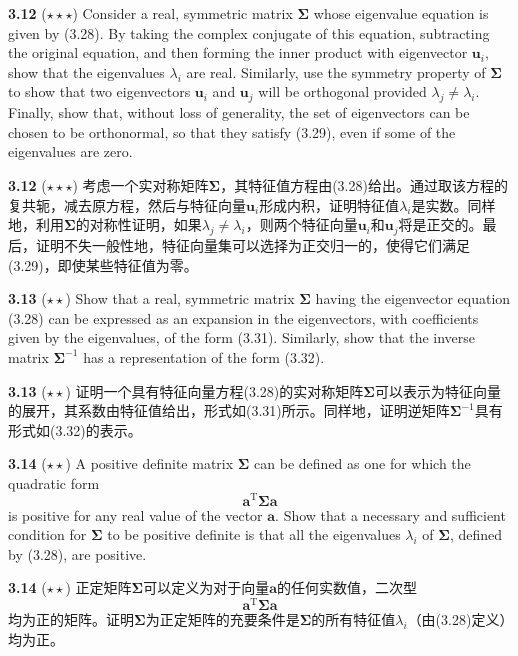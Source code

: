 \documentclass{article}
\begin{document}
\textbf{3.12} ($\star\star\star$) Consider a real, symmetric matrix $\boldsymbol{\Sigma}$ whose eigenvalue equation is given by (3.28). By taking the complex conjugate of this equation, subtracting the original equation, and then forming the inner product with eigenvector $\mathbf{u}_i$, show that the eigenvalues $\lambda_i$ are real. Similarly, use the symmetry property of $\boldsymbol{\Sigma}$ to show that two eigenvectors $\mathbf{u}_i$ and $\mathbf{u}_j$ will be orthogonal provided $\lambda_j \neq \lambda_i$. Finally, show that, without loss of generality, the set of eigenvectors can be chosen to be orthonormal, so that they satisfy (3.29), even if some of the eigenvalues are zero.

\textbf{3.12} ($\star\star\star$) 考虑一个实对称矩阵$\boldsymbol{\Sigma}$，其特征值方程由(3.28)给出。通过取该方程的复共轭，减去原方程，然后与特征向量$\mathbf{u}_i$形成内积，证明特征值$\lambda_i$是实数。同样地，利用$\boldsymbol{\Sigma}$的对称性证明，如果$\lambda_j \neq \lambda_i$，则两个特征向量$\mathbf{u}_i$和$\mathbf{u}_j$将是正交的。最后，证明不失一般性地，特征向量集可以选择为正交归一的，使得它们满足(3.29)，即使某些特征值为零。

\textbf{3.13} ($\star\star$) Show that a real, symmetric matrix $\boldsymbol{\Sigma}$ having the eigenvector equation (3.28) can be expressed as an expansion in the eigenvectors, with coefficients given by the eigenvalues, of the form (3.31). Similarly, show that the inverse matrix $\boldsymbol{\Sigma}^{-1}$ has a representation of the form (3.32).

\textbf{3.13} ($\star\star$) 证明一个具有特征向量方程(3.28)的实对称矩阵$\boldsymbol{\Sigma}$可以表示为特征向量的展开，其系数由特征值给出，形式如(3.31)所示。同样地，证明逆矩阵$\boldsymbol{\Sigma}^{-1}$具有形式如(3.32)的表示。

\textbf{3.14} ($\star\star$) A positive definite matrix $\boldsymbol{\Sigma}$ can be defined as one for which the quadratic form
\begin{equation}
\mathbf{a}^\mathrm{T} \boldsymbol{\Sigma} \mathbf{a} \tag{3.206}
\end{equation}
is positive for any real value of the vector $\mathbf{a}$. Show that a necessary and sufficient condition for $\boldsymbol{\Sigma}$ to be positive definite is that all the eigenvalues $\lambda_i$ of $\boldsymbol{\Sigma}$, defined by (3.28), are positive.

\textbf{3.14} ($\star\star$) 正定矩阵$\boldsymbol{\Sigma}$可以定义为对于向量$\mathbf{a}$的任何实数值，二次型
\begin{equation}
\mathbf{a}^\mathrm{T} \boldsymbol{\Sigma} \mathbf{a} \tag{3.206}
\end{equation}
均为正的矩阵。证明$\boldsymbol{\Sigma}$为正定矩阵的充要条件是$\boldsymbol{\Sigma}$的所有特征值$\lambda_i$（由(3.28)定义）均为正。
\end{document}
